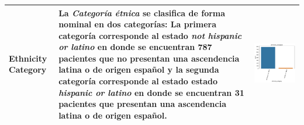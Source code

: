 \begin{table}[!htb]
\begin{threeparttable}
\begin{tabular}{p{2.5cm} p{7cm} p{6.5cm}}
			Ethnicity Category
			&La \textit{Categoría étnica} se clasifica de forma nominal en dos categorías: La primera categoría corresponde al estado \textit{not hispanic or latino} en donde se encuentran 787 pacientes que no presentan una ascendencia latina o de origen español y la segunda categoría corresponde al estado estado \textit{hispanic or latino} en donde se encuentran 31 pacientes que presentan una ascendencia latina o de origen español.
			& \begin{center}\includegraphics[width=1\linewidth]{NOTEBOOK/IMAGENES_DESCRIPTIVAS/15_ethnicity_category}\end{center}
			\\ \hline
			
		\end{tabular}
	\end{threeparttable}
\end{table}

